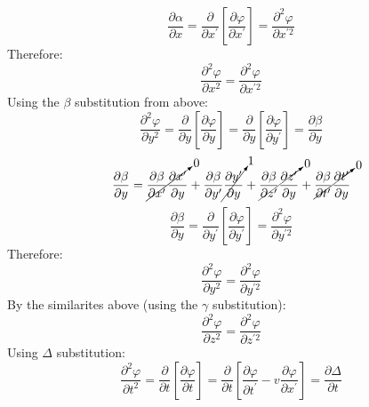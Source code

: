 \documentclass[journal]{IEEEtran}
\begin{document}
\begin{equation}
\frac{\partial\alpha}{\partial x} = \frac{\partial}{\partial x^\prime}
\left[\frac{\partial\varphi}{\partial x^\prime}\right] =
\frac{\partial^2\varphi}{\partial x^{\prime 2}}
\end{equation}
Therefore:
\begin{equation}
\boxed{
\frac{\partial^2\varphi}{\partial x^2} = 
\frac{\partial^2\varphi}{\partial x^{\prime 2}}}
\end{equation}
Using the \underline{$\beta$} substitution from above:
\begin{equation}
\frac{\partial^2\varphi}{\partial y^2} = \frac{\partial}{\partial y}
\left[\frac{\partial\varphi}{\partial y}\right] =
\frac{\partial}{\partial y}
\left[\frac{\partial\varphi}{\partial y^\prime}\right] =
\frac{\partial\beta}{\partial y}
\end{equation}
\begin{equation}
\frac{\partial\beta}{\partial y} =
\cancelto{0}{\frac{\partial\beta}{\partial x^\prime}
\frac{\partial x^\prime}{\partial y}} +
\frac{\partial\beta}{\partial y^\prime}
\cancelto{1}{\frac{\partial y^\prime}{\partial y}} +
\cancelto{0}{\frac{\partial\beta}{\partial z^\prime}
\frac{\partial z^\prime}{\partial y}} +
\cancelto{0}{\frac{\partial\beta}{\partial t^\prime}
\frac{\partial t^\prime}{\partial y}}
\end{equation}
\begin{equation}
\frac{\partial\beta}{\partial y} = \frac{\partial}{\partial y^\prime}
\left[\frac{\partial\varphi}{\partial y^\prime}\right] =
\frac{\partial^2\varphi}{\partial y^{\prime 2}}
\end{equation}
Therefore:
\begin{equation}
\boxed{
\frac{\partial^2\varphi}{\partial y^2} = 
\frac{\partial^2\varphi}{\partial y^{\prime 2}}}
\end{equation}
By the similarites above (using the \underline{$\gamma$}
substitution):
\begin{equation}
\boxed{
\frac{\partial^2\varphi}{\partial z^2} = 
\frac{\partial^2\varphi}{\partial z^{\prime 2}}}
\end{equation}
Using $\Delta$ substitution:
\begin{equation}
\frac{\partial^2\varphi}{\partial t^2} = \frac{\partial}{\partial t}
\left[\frac{\partial\varphi}{\partial t}\right]=
\frac{\partial}{\partial t}
\left[\frac{\partial\varphi}{\partial t^\prime} - 
v\frac{\partial\varphi}{\partial x^\prime}
\right] = \frac{\partial\Delta}{\partial t}
\end{equation}
\end{document}
